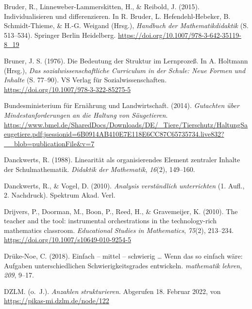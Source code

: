 \documentclass[
  ngerman,
]{scrbook}
\newlength{\cslhangindent}
\newlength{\cslentryspacingunit} %
\newenvironment{CSLReferences}[2] %
 {%
  \setlength{\parindent}{0pt}
  \ifodd #1
  \let\oldpar\par
  \def\par{\hangindent=\cslhangindent\oldpar}
  \fi
  \setlength{\parskip}{#2\cslentryspacingunit}
 }%
 {}
\theoremstyle{definition}
\theoremstyle{definition}
\theoremstyle{definition}
\theoremstyle{definition}
\theoremstyle{remark}
\begin{document}
\begin{CSLReferences}{1}{0}
\leavevmode{}%
Bruder, R., Linneweber-Lammerskitten, H., \& Reibold, J. (2015). Individualisieren und differenzieren. In R. Bruder, L. Hefendehl-Hebeker, B. Schmidt-Thieme, \& H.-G. Weigand (Hrsg.), \emph{Handbuch der {Mathematikdidaktik}} (S. 513--534). Springer Berlin Heidelberg. \url{https://doi.org/10.1007/978-3-642-35119-8_19}

\leavevmode{}%
Bruner, J. S. (1976). Die {Bedeutung} der {Struktur} im {Lernprozeß}. In A. Holtmann (Hrsg.), \emph{Das sozialwissenschaftliche {Curriculum} in der {Schule}: {Neue} {Formen} und {Inhalte}} (S. 77--90). VS Verlag für Sozialwissenschaften. \url{https://doi.org/10.1007/978-3-322-85275-5}

\leavevmode{}%
Bundesministerium für Ernährung und Landwirtschaft. (2014). \emph{Gutachten über {Mindestanforderungen} an die {Haltung} von {Säugetieren}}. \url{https://www.bmel.de/SharedDocs/Downloads/DE/_Tiere/Tierschutz/HaltungSaeugetiere.pdf;jsessionid=6B0914AB410E7E118E6CC87C65735734.live832?__blob=publicationFile\&v=7}

\leavevmode{}%
Danckwerts, R. (1988). Linearität als organisierendes Element zentraler Inhalte der Schulmathematik. \emph{Didaktik der Mathematik}, \emph{16}(2), 149--160.

\leavevmode{}%
Danckwerts, R., \& Vogel, D. (2010). \emph{Analysis verständlich unterrichten} (1. Aufl., 2. Nachdruck). Spektrum Akad. Verl.

\leavevmode{}%
Drijvers, P., Doorman, M., Boon, P., Reed, H., \& Gravemeijer, K. (2010). The teacher and the tool: instrumental orchestrations in the technology-rich mathematics classroom. \emph{Educational Studies in Mathematics}, \emph{75}(2), 213--234. \url{https://doi.org/10.1007/s10649-010-9254-5}

\leavevmode{}%
Drüke-Noe, C. (2018). Einfach -- mittel -- schwierig \ldots{} {Wenn} das so einfach wäre: {Aufgaben} unterschiedlichen {Schwierigkeitsgrades} entwickeln. \emph{mathematik lehren}, \emph{209}, 9--17.

\leavevmode{}%
DZLM. (o.~J.). \emph{Anzahlen strukturieren}. Abgerufen 18. Februar 2022, von \url{https://pikas-mi.dzlm.de/node/122}


\end{CSLReferences}
\end{document}
